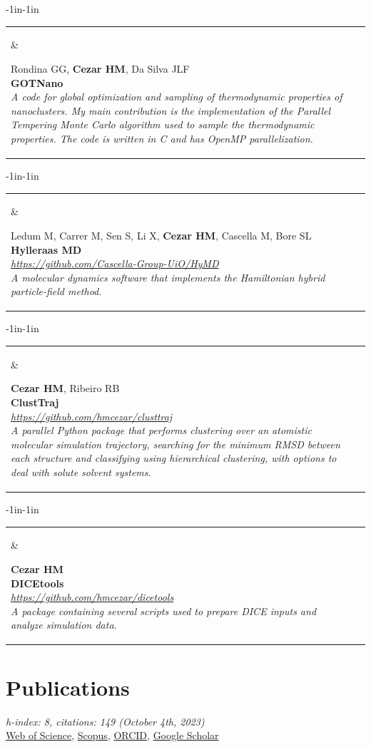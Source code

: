 \documentclass[10pt]{article}
\newcommand{\newsoftware}[3]{
\begin{adjustwidth}{-1in}{-1in}  
\begin{tabular}{p{0.9in}p{7in}}
\parbox[c]{0.9in}{} & \parbox[c]{6in}{\setstretch{0.9} {\scriptsize {#1}} \\ {\bf #2}  \\ {\footnotesize\emph {#3}}}
\end{tabular}
\end{adjustwidth}
\vspace{0.2in}
}
\begin{document}
\newsoftware{Rondina GG, \textbf{Cezar HM}, Da Silva JLF}{GOTNano}{ 
A code for global optimization and sampling of thermodynamic properties of nanoclusters. My main contribution is the implementation of the Parallel Tempering Monte Carlo algorithm used to sample the thermodynamic properties. The code is written in C and has OpenMP parallelization.}

\newsoftware{Ledum M, Carrer M, Sen S, Li X, \textbf{Cezar HM}, Cascella M, Bore SL}{Hylleraas MD}{\href{https://github.com/Cascella-Group-UiO/HyMD}{https://github.com/Cascella-Group-UiO/HyMD} \\ 
A molecular dynamics software that implements the Hamiltonian hybrid particle-field method.}

\newsoftware{\textbf{Cezar HM}, Ribeiro RB}{ClustTraj}{\href{https://github.com/hmcezar/clusttraj}{https://github.com/hmcezar/clusttraj} \\ 
A parallel Python package that performs clustering over an atomistic molecular simulation trajectory, searching for the minimum RMSD between each structure and classifying using hierarchical clustering, with options to deal with solute solvent systems.}

\newsoftware{\textbf{Cezar HM}}{DICEtools}{\href{https://github.com/hmcezar/dicetools}{https://github.com/hmcezar/dicetools} \\ 
A package containing several scripts used to prepare DICE inputs and analyze simulation data.}




\section*{Publications}


\textit{h-index: 8, citations: 149 (October 4th, 2023)} \\
\href{https://www.webofscience.com/wos/author/record/445303}{Web of Science}, 
\href{https://www.scopus.com/authid/detail.uri?authorId=57188802591}{Scopus},
\href{https://orcid.org/0000-0002-7553-0482}{ORCID}, 
\href{https://scholar.google.com.br/citations?hl=pt-BR&user=LtBk3gEAAAAJ}{Google Scholar} 
\end{document}
